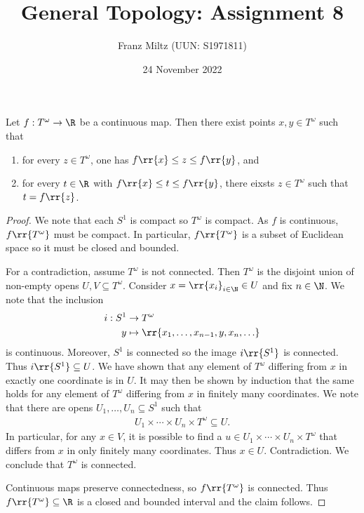 \documentclass{article}
\begin{document}
\title{General Topology: Assignment 8}
\author{Franz Miltz (UUN: S1971811)}
\date{24 November 2022}
\maketitle

\begin{claim*}
  Let $f:T^\omega\to\R$ be a continuous map. Then there exist points $x,y\in T^\omega$ such that
  \begin{enumerate}
    \item for every $z\in T^\omega$, one has $f\rr{x}\leq z\leq f\rr{y}$, and
    \item for every $t\in\R$ with $f\rr{x}\leq t \leq f\rr{y}$, there eixsts $z\in T^\omega$ such that
      $t=f\rr{z}$.
  \end{enumerate}
  \begin{proof}
    We note that each $S^1$ is compact so $T^\omega$ is compact. As $f$ is continuous, $f\rr{T^\omega}$
    must be compact. In particular, $f\rr{T^\omega}$ is a subset of Euclidean space so it must be closed and bounded.

    For a contradiction, assume $T^\omega$ is not connected. Then $T^\omega$ is the disjoint union
    of non-empty opens $U,V\subseteq T^\omega$. Consider $x=\rr{x_i}_{i\in\N}\in U$ and fix $n\in\N$.
    We note that the inclusion
    \begin{align*}
      i:S^1 &\to T^\omega \\
      y     &\mapsto \rr{x_1,\ldots,x_{n-1},y,x_n,\ldots}
    \end{align*}
    is continuous.
    Moreover, $S^1$ is connected so the image $i\rr{S^1}$ is connected. Thus
    $i\rr{S^1}\subseteq U$. We have shown that any element of $T^\omega$ differing from $x$ in exactly
    one coordinate is in $U$. It may then be shown by induction that the same holds for any
    element of $T^\omega$ differing from $x$ in finitely many coordinates. We note that there
    are opens $U_1,\ldots,U_n\subseteq S^1$ such that
    \begin{align*}
      U_1\times\cdots\times U_n\times T^\omega\subseteq U.
    \end{align*}
    In particular, for any $x\in V$, it is possible to find a $u\in U_1\times\cdots\times U_n\times T^\omega$
    that differs from $x$ in only finitely many coordinates. Thus $x\in U$. Contradiction.
    We conclude that $T^\omega$ is connected.

    Continuous maps preserve connectedness, so $f\rr{T^\omega}$ is connected. Thus
    $f\rr{T^\omega}\subseteq\R$ is a closed and bounded interval and the claim follows.
  \end{proof}
\end{claim*}
\end{document}
